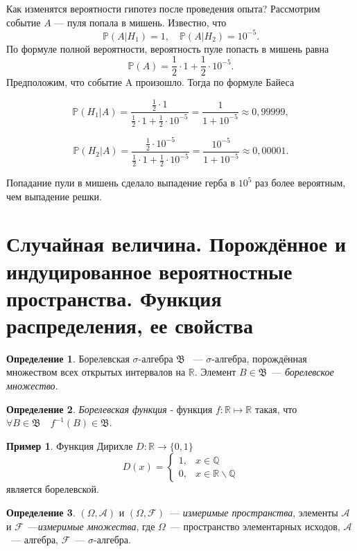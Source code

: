 \documentclass[oneside,final,14pt]{extreport}
\theoremstyle{definition}
\newtheorem{defn}{Определение}[section]
\newtheorem*{exmp}{Пример}
\begin{document}
Как изменятся вероятности гипотез после проведения опыта? Рассмотрим
событие $A$ — пуля попала в мишень. Известно, что
$$\mathbb{P}\left(A | H_{1}\right)=1, \quad \mathbb{P}\left(A | H_{2}\right)=10^{-5}.$$
По формуле полной вероятности, вероятность пуле попасть в мишень равна
$$\mathbb{P}(A)=\frac{1}{2} \cdot 1+\frac{1}{2} \cdot 10^{-5}.$$
Предположим, что событие A произошло. Тогда по формуле Байеса

$$\mathbb{P}\left(H_{1} | A\right)=\frac{\frac{1}{2} \cdot 1}{\frac{1}{2} \cdot 1+\frac{1}{2} \cdot 10^{-5}}=\frac{1}{1+10^{-5}} \approx 0,99999,$$

$$\mathbb{P}\left(H_{2} | A\right)=\frac{\frac{1}{2} \cdot 10^{-5}}{\frac{1}{2} \cdot 1+\frac{1}{2} \cdot 10^{-5}}=\frac{10^{-5}}{1+10^{-5}} \approx 0,00001.$$

Попадание пули в мишень сделало выпадение герба в $10^5$ раз более вероятным, чем выпадение решки.

\section{Случайная величина. Порождённое и индуцированное вероятностные пространства. Функция распределения, ее свойства}

\begin{defn}
    {\it \( \text{Борелевская~} \sigma \text{-алгебра~} \mathfrak{B} \) }~--- \( \sigma \text{-алгебра}\), порождённая множеством всех открытых интервалов на $\mathbb{R}$. Элемент \(B \in \mathfrak{B}\)~--- {\it борелевское множество}.
\end{defn}


\begin{defn}
    {\it Борелевская функция} - функция $f: \mathbb{R} \mapsto \mathbb{R}$ такая, что $\forall B \in \mathfrak{B} \quad f^{-1}(B) \in \mathfrak{B}$.
\end{defn}

\begin{exmp}
    Функция Дирихле $D: \mathbb{R} \rightarrow\{0,1\}$
    \begin{equation*}
        D(x)=\left\{\begin{array}{ll}
        1, & x \in \mathbb{Q} \\
        0, & x \in \mathbb{R} \backslash \mathbb{Q}
        \end{array}\right.
    \end{equation*}
является борелевской. 
\end{exmp}

\begin{defn}
    \( (\Omega, \mathcal{A}) \) и \( (\Omega, \mathcal{F}) \)~--- {\it измеримые пространства}, элементы \(\mathcal{A}\) и \(\mathcal{F}\)~---{\it измеримые множества}, где $\Omega$~--- пространство элементарных исходов, $\mathcal{A}$~--- алгебра, $\mathcal{F}$~--- $\sigma$-алгебра.
\end{defn}
\end{document}
